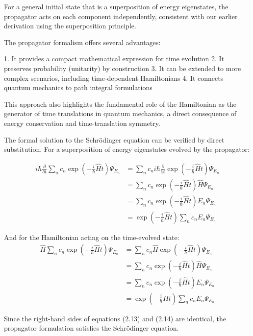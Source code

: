\documentclass[10pt]{article}
\begin{document}
For a general initial state that is a superposition of energy eigenstates, the propagator acts on each component independently, consistent with our earlier derivation using the superposition principle.

The propagator formalism offers several advantages:

1. It provides a compact mathematical expression for time evolution
2. It preserves probability (unitarity) by construction
3. It can be extended to more complex scenarios, including time-dependent Hamiltonians
4. It connects quantum mechanics to path integral formulations

This approach also highlights the fundamental role of the Hamiltonian as the generator of time translations in quantum mechanics, a direct consequence of energy conservation and time-translation symmetry.


The formal solution to the Schrödinger equation can be verified by direct substitution. For a superposition of energy eigenstates evolved by the propagator:

\begin{align*}
i\hbar\frac{\partial}{\partial t}\sum_n c_n\exp\left(-\frac{i}{\hbar}\hat{H}t\right)\Psi_{E_n} &= \sum_n c_n i\hbar\frac{\partial}{\partial t}\exp\left(-\frac{i}{\hbar}\hat{H}t\right)\Psi_{E_n} \\
&= \sum_n c_n\exp\left(-\frac{i}{\hbar}\hat{H}t\right)\hat{H}\Psi_{E_n} \\
&= \sum_n c_n\exp\left(-\frac{i}{\hbar}\hat{H}t\right)E_n\Psi_{E_n} \tag{2.13} \\
&= \exp\left(-\frac{i}{\hbar}\hat{H}t\right)\sum_n c_nE_n\Psi_{E_n}
\end{align*}

And for the Hamiltonian acting on the time-evolved state:
\begin{align*}
\hat{H}\sum_n c_n\exp\left(-\frac{i}{\hbar}\hat{H}t\right)\Psi_{E_n} &= \sum_n c_n\hat{H}\exp\left(-\frac{i}{\hbar}\hat{H}t\right)\Psi_{E_n} \\
&= \sum_n c_n\exp\left(-\frac{i}{\hbar}\hat{H}t\right)\hat{H}\Psi_{E_n} \\
&= \sum_n c_n\exp\left(-\frac{i}{\hbar}\hat{H}t\right)E_n\Psi_{E_n} \tag{2.14} \\
&= \exp\left(-\frac{i}{\hbar}\hat{H}t\right)\sum_n c_nE_n\Psi_{E_n}
\end{align*}

Since the right-hand sides of equations (2.13) and (2.14) are identical, the propagator formulation satisfies the Schrödinger equation.
\end{document}
